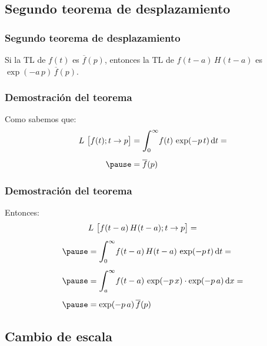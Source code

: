 \subsection{Segundo teorema de desplazamiento}

\begin{frame}
\frametitle{Segundo teorema de desplazamiento}
Si la TL de $f (t)$ es $\overline{f} (p)$, \pause entonces la TL de $f (t - a) \, H (t - a)$ es \pause $\exp(-a \, p) \, \overline{f} (p)$.
\end{frame}
\begin{frame}
\frametitle{Demostración del teorema}
Como sabemos que:
\pause
\begin{eqnarray*}
\begin{aligned}
L \big[  f (t); t \to p  \big] &= \scaleint{6ex}_{\bs 0}^{\infty} f (t) \, \exp(-p \, t) \dd{t} = \\[0.5em] \pause
&= \overline{f} (p)
\end{aligned}
\end{eqnarray*}
\end{frame}
\begin{frame}
\frametitle{Demostración del teorema}
Entonces:
\pause
\begin{eqnarray}
\begin{aligned}
&L \big[  f (t - a) \, H (t - a); t \to p  \big] = \\[0.5em] \pause
&= \scaleint{6ex}_{\bs 0}^{\infty} f (t - a) \, H (t - a) \, \exp(-p \, t) \dd{t} = \\[0.5em] \pause
&= \scaleint{6ex}_{\bs a}^{\infty} f (t - a) \, \exp(-p \, x) \cdot \exp(-p \, a) \dd{x} = \\[0.5em] \pause
&= \exp(-p \, a) \, \overline{f} (p) 
\end{aligned}
\label{eq:ecuacion_03_08}
\end{eqnarray}
\end{frame}

\subsection{Cambio de escala}

